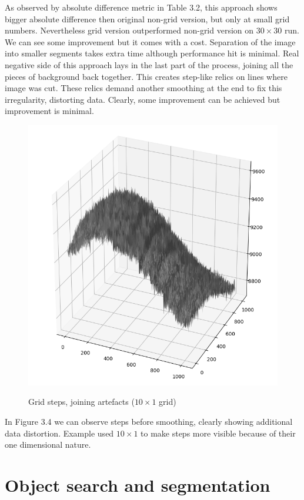 \documentclass[12pt, a4paper, oneside]{book}
\begin{document}
As observed by absolute difference metric in Table 3.2, this approach shows bigger absolute difference then original non-grid version, but only at small grid numbers. Nevertheless grid version outperformed non-grid version on $30 \times 30$ run.
We can see some improvement but it comes with a cost.
Separation of the image into smaller segments takes extra time although performance hit is minimal.
Real negative side of this approach lays in the last part of the process, joining all the pieces of background back together.
This creates step-like relics on lines where image was cut.
These relics demand another smoothing at the end to fix this irregularity, distorting data.
Clearly, some improvement can be achieved but improvement is minimal.

\begin{figure}[!hbt]
    \begin{center}
        \includegraphics[scale=0.50]{images/grid_steps.png}
        \label{img:grid_steps}
        \caption{Grid steps, joining artefacts ($10 \times 1$ grid)}
    \end{center}
\end{figure}

In Figure 3.4 we can observe steps before smoothing, clearly showing additional data distortion.
Example used $10 \times 1$ to make steps more visible because of their one dimensional nature.

\section{Object search and segmentation}

\backmatter




\listoffigures
\end{document}
